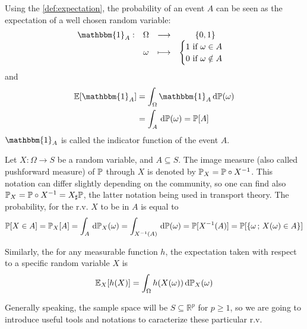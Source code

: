 \documentclass[../../Main_ManuscritThese.tex]{subfiles}
\begin{document}
\begin{remark}
  Using the \cref{def:expectation}, the probability of an event $A$ can be seen as the expectation of a well chosen random variable:
  \begin{equation}
    \begin{array}{cccc}
      \mathbbm{1}_{A}:& \Omega& \longrightarrow& \{0,1\} \\
                      & \omega& \longmapsto & \begin{cases}
                        1\text{ if } \omega \in A \\
                        0 \text{ if } \omega \notin A
                                              \end{cases}
    \end{array}
  \end{equation}
  and
  \begin{align*}
    \Ex[\mathbbm{1}_A] &= \int_{\Omega} \mathbbm{1}_A \, \mathrm{d}\Prob(\omega) \\
                       &= \int_{A} \, \mathrm{d}\Prob(\omega) = \Prob[A]
  \end{align*}
  $\mathbbm{1}_A$ is called the indicator function of the event $A$.
\end{remark}
\begin{definition}
  \label{def:image_measure}
  Let $X:\Omega \rightarrow S$ be a random variable, and $A \subseteq S$. The image measure (also called pushforward measure) of $\mathbb{P}$ through $X$ is denoted by $\mathbb{P}_X = \mathbb{P} \circ X^{-1}$. This notation can differ slightly depending on the community, so one can find also $ \mathbb{P}_X = \mathbb{P} \circ X^{-1} = X_{\sharp}\mathbb{P}$, the latter notation being used in transport theory. The probability, for the r.v. $X$ to be in $A$ is equal to
  \begin{equation}
    \mathbb{P}[X \in A] = \mathbb{P}_X[A] = \int_{A}\,\mathrm{d}\mathbb{P}_X(\omega) =  \int_{X^{-1}(A)}\,\mathrm{d}\mathbb{P}(\omega) = \mathbb{P}[X^{-1}(A)] = \mathbb{P}[\{\omega\,;\,X(\omega) \in A\}]
  \end{equation}

  
Similarly, the for any measurable function $h$, the expectation taken with respect to a specific random variable $X$ is 
\begin{equation}
  \mathbb{E}_{X}[h(X)] = \int_{\Omega} h(X(\omega)) \,\mathrm{d}\mathbb{P}_{X}(\omega)
\end{equation}
\end{definition}
Generally speaking, the sample space will be $S\subseteq \mathbb{R}^p$ for $p\geq 1$, so we are going to introduce useful tools and notations to caracterize these particular r.v.
\end{document}

